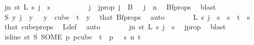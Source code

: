 \begin{isabellebody}
\ {\isachardoublequoteopen}{\isacharparenleft}{\kern0pt}{\isasymexists}j{\isacharless}{\kern0pt}n{\isachardot}{\kern0pt}\ {\isasymforall}s{\isacharless}{\kern0pt}t{\isachardot}{\kern0pt}\ {\isacharparenleft}{\kern0pt}L\ s\ j\ {\isacharequal}{\kern0pt}\ s{\isacharparenright}{\kern0pt}{\isacharparenright}{\kern0pt}{\isachardoublequoteclose}\isanewline
\ \ \isamarkupfalse%
\ {\isacharminus}{\kern0pt}\isanewline
\ \ \ \ \isamarkupfalse%
\ j\ \ j{\isacharunderscore}{\kern0pt}prop{\isacharcolon}{\kern0pt}\ {\isachardoublequoteopen}j\ {\isasymin}\ B\ {}\ {\isasymand}\ j\ {\isacharless}{\kern0pt}\ n{\isachardoublequoteclose}\ \isamarkupfalse%
\ Bf{\isacharunderscore}{\kern0pt}props\ \isamarkupfalse%
\ blast\isanewline
\ \ \ \ \isamarkupfalse%
\ \isamarkupfalse%
\ {\isachardoublequoteopen}{\isacharparenleft}{\kern0pt}S\ y{\isacharparenright}{\kern0pt}\ j\ {\isacharequal}{\kern0pt}\ y\ {}{\isachardoublequoteclose}\ \ {\isachardoublequoteopen}y\ {\isasymin}\ cube\ {}\ t{\isachardoublequoteclose}\ \ y\ \isamarkupfalse%
\ that\ Bf{\isacharunderscore}{\kern0pt}props\ \isamarkupfalse%
\ auto\isanewline
\ \ \ \ \isamarkupfalse%
\ \isamarkupfalse%
\ {\isachardoublequoteopen}L\ s\ j\ {\isacharequal}{\kern0pt}\ s{\isachardoublequoteclose}\ \ {\isachardoublequoteopen}s\ {\isacharless}{\kern0pt}\ t{\isachardoublequoteclose}\ \ s\ \isamarkupfalse%
\ that\ cube{\isacharunderscore}{\kern0pt}props{\isacharparenleft}{\kern0pt}{}{\isacharcomma}{\kern0pt}{}{\isacharparenright}{\kern0pt}\ \isamarkupfalse%
\ L{\isacharunderscore}{\kern0pt}def\ \isamarkupfalse%
\ auto\isanewline
\ \ \ \ \isamarkupfalse%
\ \isamarkupfalse%
\ {\isachardoublequoteopen}{\isasymexists}j{\isacharless}{\kern0pt}n{\isachardot}{\kern0pt}\ {\isasymforall}s{\isacharless}{\kern0pt}t{\isachardot}{\kern0pt}\ {\isacharparenleft}{\kern0pt}L\ s\ j\ {\isacharequal}{\kern0pt}\ s{\isacharparenright}{\kern0pt}{\isachardoublequoteclose}\ \isamarkupfalse%
\ j{\isacharunderscore}{\kern0pt}prop\ \isamarkupfalse%
\ blast\isanewline
\ \ \isamarkupfalse%
\isanewline
\ \ \isamarkupfalse%
\ \isamarkupfalse%
\ {\isachardoublequoteopen}is{\isacharunderscore}{\kern0pt}line\ {\isacharparenleft}{\kern0pt}{\isasymlambda}s{\isasymin}{\isacharbraceleft}{\kern0pt}{\isachardot}{\kern0pt}{\isachardot}{\kern0pt}{\isacharless}{\kern0pt}t{\isacharbraceright}{\kern0pt}{\isachardot}{\kern0pt}\ S\ {\isacharparenleft}{\kern0pt}SOME\ p{\isachardot}{\kern0pt}\ p{\isasymin}cube\ {}\ t\ {\isasymand}\ p\ {}\ {\isacharequal}{\kern0pt}\ s{\isacharparenright}{\kern0pt}{\isacharparenright}{\kern0pt}\ n\ t{\isachardoublequoteclose}\ \isamarkupfalse%

\end{isabellebody}
